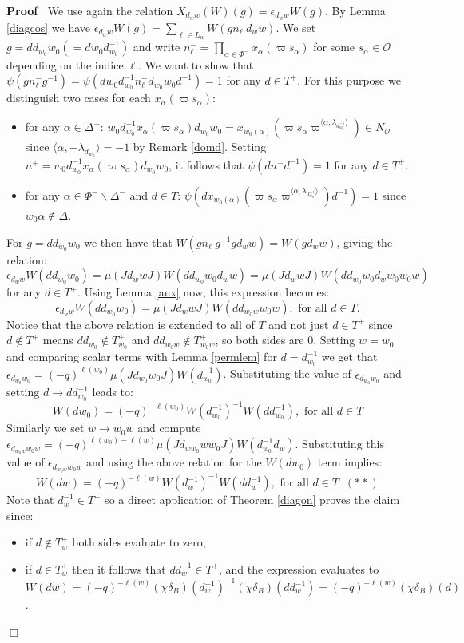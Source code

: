 \documentclass{article}
\newenvironment{proof}{\noindent\textbf{Proof\ }}{\hspace*{\fill}$\Box$\medskip}
\begin{document}
\begin{proof}
We use again the relation $X_{d_ww}(W)(g)=\epsilon_{d_ww}W(g)$. By Lemma \ref{diagcos} we have
$\epsilon_{d_ww}W(g)=\sum\limits_{\ell\in L_w}W(gn_{\ell}^-d_ww)$. We set $g=dd_{w_0}w_0(=dw_0d_{w_0}^{-1})$ and write $n_{\ell}^-=\prod\limits_{\alpha\in \Phi^-}x_{\alpha}(\varpi s_{\alpha})$ for some $s_{\alpha}\in\mathcal{O}$ depending on the indice $\ell$. We want to show that $\psi(gn_{\ell}^-g^{-1})=\psi(dw_0d_{w_0}^{-1}n_{\ell}^-d_{w_0}w_0d^{-1})=1$ for any $d\in T^+$. For this purpose we distinguish two cases for each $x_{\alpha}(\varpi s_{\alpha})$: 
\begin{itemize}
    \item for any $\alpha\in\Delta^-$: $w_0d_{w_0}^{-1}x_{\alpha}(\varpi s_{\alpha})d_{w_0}w_0=x_{w_0(\alpha)}(\varpi s_{\alpha}\varpi^{\langle\alpha,\lambda_{d_{w_0}^{-1}}\rangle})\in N_{\mathcal{O}}$ since $\langle\alpha,-\lambda_{d_{w_0}}\rangle={-1}$ by Remark \ref{domd}. Setting $n^+=w_0d_{w_0}^{-1}x_{\alpha}(\varpi s_{\alpha})d_{w_0}w_0$, it follows that $\psi(dn^+d^{-1})=1$ for any $d\in T^+$.
    \item for any $\alpha\in\Phi^-\backslash\Delta^-$ and $d\in T$: $\psi(dx_{w_0(\alpha)}(\varpi s_{\alpha}\varpi^{\langle\alpha,\lambda_{d_{w_0}^{-1}}\rangle})d^{-1})=1$ since $w_0\alpha\not\in\Delta$.
\end{itemize} For $g=dd_{w_0}w_0$ we then have that $W(gn_{\ell}^-g^{-1}gd_ww)=W(gd_ww)$, giving the relation:  $$\epsilon_{d_ww}W(dd_{w_0}w_0)=\mu(Jd_wwJ)W(dd_{w_0}w_0d_ww)=\mu(Jd_wwJ)W(dd_{w_0}w_0d_ww_0w_0w)$$ for any $d\in T^+$. Using Lemma \ref{aux} now, this expression becomes:
$$\epsilon_{d_ww}W(dd_{w_0}w_0)=\mu(Jd_wwJ)W(dd_{w_0w}w_0w),\text{ for all } d\in T.$$
Notice that the above relation is extended to all of $T$ and not just $d\in T^+$ since $d\not\in T^+$ means $dd_{w_0}\not\in T_{w_0}^+$ and $dd_{w_0w}\not\in T_{w_0w}^+$, so both sides are $0$.
Setting $w=w_0$ and comparing scalar terms with Lemma \ref{permlem} for $d=d_{w_0}^{-1}$ we get that $\epsilon_{d_{w_0}w_0}=(-q)^{\ell(w_0)}\mu(Jd_{w_0}w_0J)W(d_{w_0}^{-1})$. Substituting the value of $\epsilon_{d_{w_0}w_0}$ and setting $d\to dd_{w_0}^{-1}$ leads to: 
$$W(dw_0)=(-q)^{-\ell(w_0)}W(d_{w_0}^{-1})^{-1}W(dd_{w_0}^{-1}), \text{ for all } d\in T$$ Similarly we set $w\to w_0w$ and compute $\epsilon_{d_{w_0w}w_0w}=(-q)^{\ell(w_0)-\ell(w)}\mu(Jd_{ww_0}ww_0J)W(d_{w_0}^{-1}d_w)$. Substituting this value of $\epsilon_{d_{w_0w}w_0w}$ and using the above relation for the $W(dw_0)$ term implies:
$$W(dw)=(-q)^{-\ell(w)}W(d_{w}^{-1})^{-1}W(dd_{w}^{-1}), \text{ for all } d\in T \; \; (**)$$ Note that $d_w^{-1}\in T^+$ so a direct application of Theorem \ref{diagon} proves the claim since: 
\begin{itemize}
    \item if $d\not\in T_w^+$ both sides evaluate to zero,
    \item if $d\in T_w^+$ then it follows that $dd_w^{-1}\in T^+$, and the expression evaluates to $W(dw)=(-q)^{-\ell(w)}(\chi\delta_B)(d_w^{-1})^{-1}(\chi\delta_B)(dd_w^{-1})=(-q)^{-\ell(w)}(\chi\delta_B)(d)$.
\end{itemize}
\end{proof}
\end{document}
